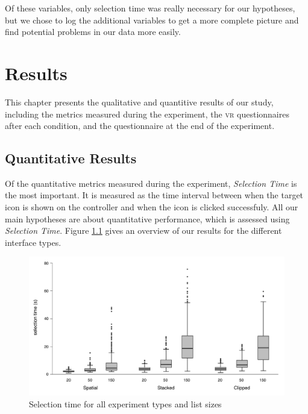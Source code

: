 \documentclass{tufte-book} %
\begin{document}
Of these variables, only selection time was really necessary for our hypotheses, but we chose to log the additional variables to get a more complete picture and find potential problems in our data more easily.



\chapter{Results}
\label{ch:results}

This chapter presents the qualitative and quantitive results of our study, including the metrics measured during the experiment, the \textsc{vr} questionnaires after each condition, and the questionnaire at the end of the experiment.

\section{Quantitative Results}
Of the quantitative metrics measured during the experiment, \emph{Selection Time} is the most important. It is measured as the time interval between when the target icon is shown on the controller and when the icon is clicked successfuly. All our main hypotheses are about quantitative performance, which is assessed using \emph{Selection Time}. Figure \ref{fig:all-durations-chart} gives an overview of our results for the different interface types.

\begin{figure}[h]
  \includegraphics[width=\linewidth]{all-durations.pdf}
  \caption{Selection time for all experiment types and list sizes}
  \label{fig:all-durations-chart}
\end{figure}
\end{document}
